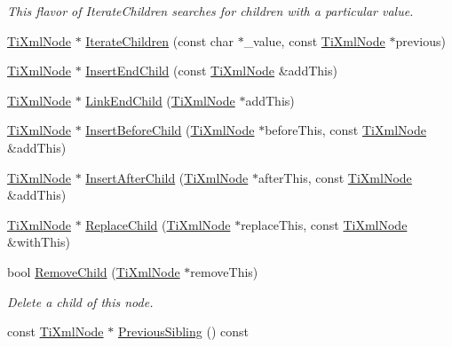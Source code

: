 \begin{DoxyCompactItemize}
\begin{DoxyCompactList}\small\item\em This flavor of Iterate\+Children searches for children with a particular \textquotesingle{}value\textquotesingle{}. \end{DoxyCompactList}\item 
\hyperlink{class_ti_xml_node}{Ti\+Xml\+Node} $\ast$ \hyperlink{class_ti_xml_node_a67ba8275e533e6f76340236c42ea0aea}{Iterate\+Children} (const char $\ast$\+\_\+value, const \hyperlink{class_ti_xml_node}{Ti\+Xml\+Node} $\ast$previous)
\item 
\hyperlink{class_ti_xml_node}{Ti\+Xml\+Node} $\ast$ \hyperlink{class_ti_xml_node_af287a913ce46d8dbf7ef24fec69bbaf0}{Insert\+End\+Child} (const \hyperlink{class_ti_xml_node}{Ti\+Xml\+Node} \&add\+This)
\item 
\hyperlink{class_ti_xml_node}{Ti\+Xml\+Node} $\ast$ \hyperlink{class_ti_xml_node_a1a881212554b759865f6cac79a851d38}{Link\+End\+Child} (\hyperlink{class_ti_xml_node}{Ti\+Xml\+Node} $\ast$add\+This)
\item 
\hyperlink{class_ti_xml_node}{Ti\+Xml\+Node} $\ast$ \hyperlink{class_ti_xml_node_a71e54e393336382bc9875f64aab5cb15}{Insert\+Before\+Child} (\hyperlink{class_ti_xml_node}{Ti\+Xml\+Node} $\ast$before\+This, const \hyperlink{class_ti_xml_node}{Ti\+Xml\+Node} \&add\+This)
\item 
\hyperlink{class_ti_xml_node}{Ti\+Xml\+Node} $\ast$ \hyperlink{class_ti_xml_node_a274db3292218202805c093f66a964cb5}{Insert\+After\+Child} (\hyperlink{class_ti_xml_node}{Ti\+Xml\+Node} $\ast$after\+This, const \hyperlink{class_ti_xml_node}{Ti\+Xml\+Node} \&add\+This)
\item 
\hyperlink{class_ti_xml_node}{Ti\+Xml\+Node} $\ast$ \hyperlink{class_ti_xml_node_a543208c2c801c84a213529541e904b9f}{Replace\+Child} (\hyperlink{class_ti_xml_node}{Ti\+Xml\+Node} $\ast$replace\+This, const \hyperlink{class_ti_xml_node}{Ti\+Xml\+Node} \&with\+This)
\item 
bool \hyperlink{class_ti_xml_node_ae19d8510efc90596552f4feeac9a8fbf}{Remove\+Child} (\hyperlink{class_ti_xml_node}{Ti\+Xml\+Node} $\ast$remove\+This)
\begin{DoxyCompactList}\small\item\em Delete a child of this node. \end{DoxyCompactList}\item 
const \hyperlink{class_ti_xml_node}{Ti\+Xml\+Node} $\ast$ \hyperlink{class_ti_xml_node_ac2cd892768726270e511b2ab32de4d10}{Previous\+Sibling} () const 

\end{DoxyCompactItemize}
